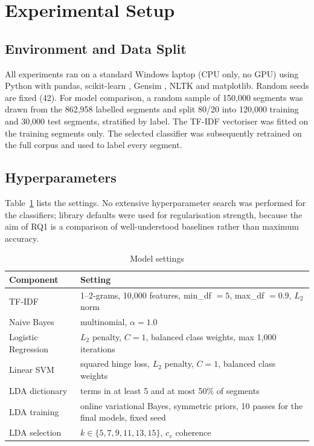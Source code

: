 \documentclass[11pt,journal,draftclsnofoot,onecolumn]{IEEEtran}
\begin{document}
\section{Experimental Setup}
\subsection{Environment and Data Split}
All experiments ran on a standard Windows laptop (CPU only, no GPU) using Python with pandas, scikit-learn \cite{pedregosa2011}, Gensim \cite{rehurek2010}, NLTK \cite{bird2009} and matplotlib. Random seeds are fixed (42). For model comparison, a random sample of 150,000 segments was drawn from the 862,958 labelled segments and split 80/20 into 120,000 training and 30,000 test segments, stratified by label. The TF-IDF vectoriser was fitted on the training segments only. The selected classifier was subsequently retrained on the full corpus and used to label every segment.

\subsection{Hyperparameters}
Table~\ref{tab:hyper} lists the settings. No extensive hyperparameter search was performed for the classifiers; library defaults were used for regularisation strength, because the aim of RQ1 is a comparison of well-understood baselines rather than maximum accuracy.

\begin{table}[!t]
\caption{Model settings}
\label{tab:hyper}
\centering
\small
\begin{tabular}{p{3.1cm}p{9cm}}
\toprule
Component & Setting \\
\midrule
TF-IDF & 1--2-grams, 10,000 features, min\_df $=5$, max\_df $=0.9$, $L_2$ norm \\
Naive Bayes & multinomial, $\alpha=1.0$ \\
Logistic Regression & $L_2$ penalty, $C=1$, balanced class weights, max 1,000 iterations \\
Linear SVM & squared hinge loss, $L_2$ penalty, $C=1$, balanced class weights \\
LDA dictionary & terms in at least 5 and at most 50\% of segments \\
LDA training & online variational Bayes, symmetric priors, 10 passes for the final models, fixed seed \\
LDA selection & $k\in\{5,7,9,11,13,15\}$, $c_v$ coherence \\
\bottomrule
\end{tabular}
\end{table}
\end{document}
